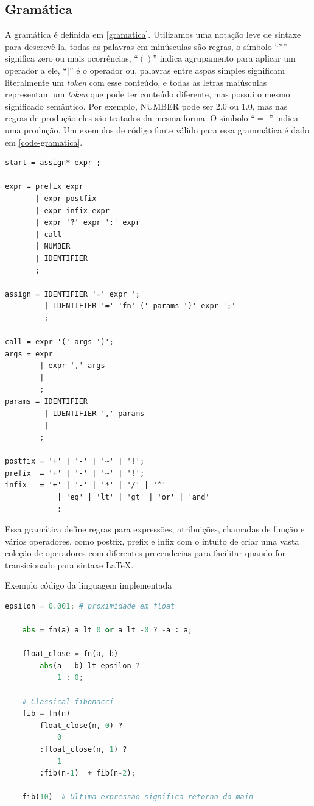 \documentclass[english, 
               brazil, 
               bsc] %
               {dcomp-abntex2}
\begin{document}
\subsection{Gramática}

A gramática é definida em \autoref{gramatica}. Utilizamos uma notação leve de sintaxe para descrevê-la, todas as palavras em minúsculas são regras, o símbolo ``$*$'' significa zero ou mais ocorrências, ``$()$'' indica agrupamento para aplicar um operador a ele, ``$|$'' é o operador ou, palavras entre aspas simples significam literalmente um \textit{token} com esse conteúdo, e todas as letras maiúsculas representam um \textit{token} que pode ter conteúdo diferente, mas possui o mesmo significado semântico. Por exemplo, NUMBER pode ser 2.0 ou 1.0, mas nas regras de produção eles são tratados da mesma forma. O símbolo ``$=$ '' indica uma produção. Um exemplos de código fonte válido para essa grammática é dado em \autoref{code-gramatica}.
\label{gramatica}
\begin{verbatim}
start = assign* expr ;

expr = prefix expr 
       | expr postfix  
       | expr infix expr 
       | expr '?' expr ':' expr
       | call
       | NUMBER
       | IDENTIFIER
       ;

assign = IDENTIFIER '=' expr ';'
         | IDENTIFIER '=' 'fn' (' params ')' expr ';'
         ; 

call = expr '(' args ')';
args = expr
        | expr ',' args
        | 
        ;
params = IDENTIFIER
         | IDENTIFIER ',' params
         | 
        ;

postfix = '+' | '-' | '~' | '!';
prefix  = '+' | '-' | '~' | '!';
infix   = '+' | '-' | '*' | '/' | '^'
            | 'eq' | 'lt' | 'gt' | 'or' | 'and'
            ;

\end{verbatim}

Essa gramática define regras para expressões, atribuições, chamadas de função e vários operadores, como postfix, prefix e infix com o intuito de criar uma vasta coleção de operadores com diferentes precendecias para facilitar quando for transicionado para sintaxe \LaTeX .


\begin{algoritmo}[H]
	\caption{Exemplo código da linguagem implementada}
	\label{code-gramatica}
  \begin{lstlisting}[language = python]
    epsilon = 0.001; # proximidade em float

    abs = fn(a) a lt 0 or a lt -0 ? -a : a;

    float_close = fn(a, b) 
        abs(a - b) lt epsilon ? 
            1 : 0;

    # Classical fibonacci
    fib = fn(n)  
        float_close(n, 0) ? 
            0
        :float_close(n, 1) ?
            1
        :fib(n-1)  + fib(n-2);

    fib(10)  # Ultima expressao significa retorno do main
  \end{lstlisting}
\end{algoritmo}
\end{document}
